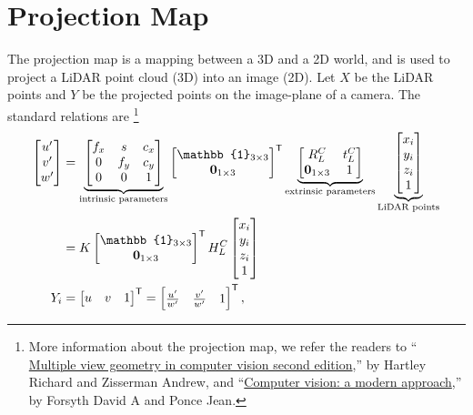 \section{Projection Map}
\label{sec:ProjectionMap}
The projection map is a mapping between a 3D and a 2D world, and is used to project a LiDAR
point cloud (3D) into an image (2D). Let $X$ be the LiDAR points and $Y$ be the
projected points on the image-plane of a camera. The standard relations are \footnote{More information
    about the projection map, we refer the readers to ``
\href{}{Multiple view geometry in computer vision second
edition},'' by Hartley Richard and Zisserman Andrew, and ``\href{}{Computer vision: a
modern approach},'' by Forsyth David A and Ponce Jean.} 
\begin{align}
    \label{eq:projection_linear}
    \begin{bmatrix}
        u^\prime\\
        v^\prime\\
        w^\prime
    \end{bmatrix} &=
    \underbrace{\begin{bmatrix}
        f_x & s & c_x \\
        0 & f_y & c_y \\
        0 & 0 & 1
    \end{bmatrix}}_{\text{intrinsic parameters}}
    \begin{bmatrix}
    \mathbb{1}_{3\times3} \\ \zeros[1\times3]
    \end{bmatrix}^\transpose
    \underbrace{\begin{bmatrix}
        R_L^C & t_L^C \\
        \zeros[1\times 3] & 1 \\
    \end{bmatrix}}_{\text{extrinsic parameters}}
    \underbrace{\begin{bmatrix}
        x_i \\
        y_i \\
        z_i \\
        1
    \end{bmatrix}}_{\text{LiDAR points}}\\
    &= K \begin{bmatrix}
    \mathbb{1}_{3\times3} \\ \zeros[1\times3]
    \end{bmatrix}^\transpose H_L^C 
    \begin{bmatrix}
        x_i \\
        y_i \\
        z_i \\
        1
    \end{bmatrix}\\
    \label{eq:projection_nonlinear}
    Y_i &= \begin{bmatrix}
        u & v & 1
    \end{bmatrix}^{\transpose} =
    \begin{bmatrix}
        \frac{u^\prime}{w^\prime} & \frac{v^\prime}{w^\prime} & 1
    \end{bmatrix}^{\transpose},
\end{align}
